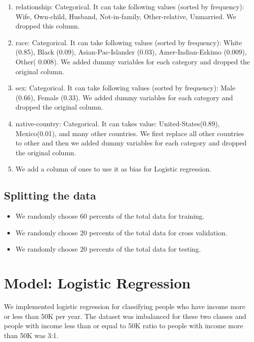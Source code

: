 \documentclass[paper=a4, fontsize=11pt]{scrartcl}
\numberwithin{equation}{section}		%
\numberwithin{figure}{section}			%
\numberwithin{table}{section}				%
\begin{document}
{\begin{enumerate}
    \item relationship: Categorical. It can take following values (sorted by frequency): Wife, Own-child, Husband, Not-in-family, Other-relative, Unmarried. We dropped this column.
    \item race: Categorical. It can take following values (sorted by frequency): White (0.85), Black (0.09), Asian-Pac-Islander (0.03), Amer-Indian-Eskimo (0.009), Other( 0.008). We added dummy variables for each category and dropped the original column.
    \item sex: Categorical. It can take following values (sorted by frequency): Male (0.66), Female (0.33). We added dummy variables for each category and dropped the original column.
    \item native-country: Categorical. It can takes value: United-States(0.89), Mexico(0.01), and many other countries. We first replace all other countries to other and then we added dummy variables for each category and dropped the original column.
    \item We add a column of ones to use it as bias for Logistic regression.
\end{enumerate}
}

\subsection{Splitting the data}
\begin{itemize}
     \item We randomly choose 60 percents of the total data for training.
    \item  We randomly choose 20 percents of the total data  for cross validation.
    \item  We randomly choose 20 percents of the total data  for testing.
\end{itemize}

\section{Model: Logistic Regression}
We implemented logistic regression for classifying people who have income more or less than 50K per year. The dataset was imbalanced for these two classes and people with income less than or equal to 50K ratio to people with income more than 50K was 3:1.
\end{document}

